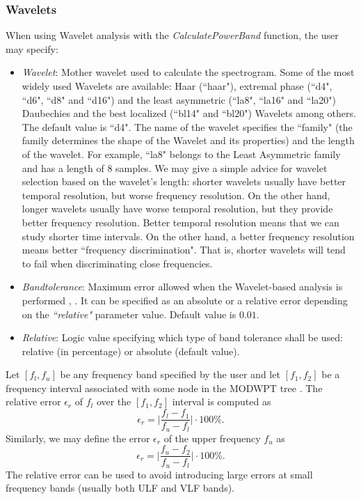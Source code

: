 \documentclass[12pt,lot, lof]{puthesis}
\begin{document}
\subsubsection{Wavelets} When using Wavelet analysis with the 
\textit{CalculatePowerBand} function, the user may specify:  
\begin{itemize}
\item \textit{Wavelet}: Mother wavelet used to calculate the spectrogram. Some 
of the most widely used Wavelets are available: Haar (``haar"), extremal phase 
(``d4", ``d6", ``d8" and ``d16") and the least asymmetric (``la8", ``la16" and 
``la20") Daubechies and the best localized (``bl14" and ``bl20") Wavelets among 
others. The default value is ``d4". The name of the wavelet specifies the 
``family" (the family determines the shape of the Wavelet and its properties) 
and the length of the wavelet. For example, ``la8" belongs to the Least 
Asymmetric family and has a length of 8 samples. We may give a simple advice 
for wavelet selection based on the wavelet's length: shorter wavelets usually 
have better temporal resolution, but worse frequency resolution. On the other 
hand, longer wavelets usually have worse temporal resolution, but they provide 
better frequency resolution. Better temporal resolution means that we can study 
shorter time intervals. On the other hand, a better frequency resolution means 
better ``frequency discrimination". That is, shorter wavelets will tend to fail 
when discriminating close frequencies.

\item \textit{Bandtolerance}: Maximum error allowed when the Wavelet-based 
analysis is performed \cite{waveletBiosignals}, \cite{waveletArticle}. It can 
be specified as an absolute or a relative error depending on the 
\textit{``relative"} parameter value. Default value is $0.01$. 
\item \textit{Relative}: Logic value specifying which type of band tolerance 
shall be used: relative (in percentage) or absolute (default value). 
\end{itemize}
Let $[f_l,f_u]$ be any frequency band specified by the user and let $[f_1,f_2]$ 
be a frequency interval associated with some node in the \linebreak 
\gls{MODWPT} tree \cite{percival2006}. The relative error $\epsilon_r$ of $f_l$ 
over the $[f_1,f_2]$ interval is computed as 
$$\epsilon_r=\Big|\frac{f_l-f_1}{f_u-f_l}\Big|\cdot100\%.$$
Similarly, we may define the error $\epsilon_r$ of the upper frequency $f_u$ as
 $$\epsilon_r=\Big|\frac{f_u-f_2}{f_u-f_l}\Big| \cdot100\%.$$
The relative error can be used to avoid introducing large errors at small 
frequency bands (usually both \gls{ULF} and \gls{VLF} bands).\\
\end{document}

